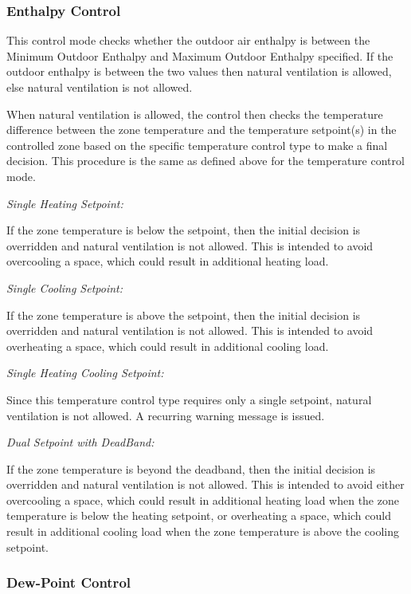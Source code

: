 \subsubsection{Enthalpy Control}\label{enthalpy-control}

This control mode checks whether the outdoor air enthalpy is between the Minimum Outdoor Enthalpy and Maximum Outdoor Enthalpy specified. If the outdoor enthalpy is between the two values then natural ventilation is allowed, else natural ventilation is not allowed.

When natural ventilation is allowed, the control then checks the temperature difference between the zone temperature and the temperature setpoint(s) in the controlled zone based on the specific temperature control type to make a final decision. This procedure is the same as defined above for the temperature control mode.

\emph{Single Heating Setpoint:}

If the zone temperature is below the setpoint, then the initial decision is overridden and natural ventilation is not allowed. This is intended to avoid overcooling a space, which could result in additional heating load.

\emph{Single Cooling Setpoint:}

If the zone temperature is above the setpoint, then the initial decision is overridden and natural ventilation is not allowed. This is intended to avoid overheating a space, which could result in additional cooling load.

\emph{Single Heating Cooling Setpoint:}

Since this temperature control type requires only a single setpoint, natural ventilation is not allowed. A recurring warning message is issued.

\emph{Dual Setpoint with DeadBand:}

If the zone temperature is beyond the deadband, then the initial decision is overridden and natural ventilation is not allowed. This is intended to avoid either overcooling a space, which could result in additional heating load when the zone temperature is below the heating setpoint, or overheating a space, which could result in additional cooling load when the zone temperature is above the cooling setpoint.

\subsubsection{Dew-Point Control}\label{dew-point-control}


